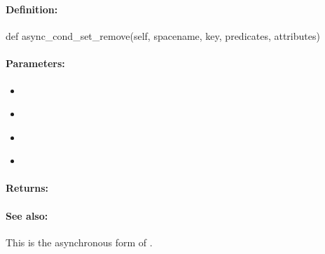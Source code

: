 \pagebreak
\subsubsection{}
\label{api:python:async_cond_set_remove}


\paragraph{Definition:}
\begin{pythoncode}
def async_cond_set_remove(self, spacename, key, predicates, attributes)
\end{pythoncode}

\paragraph{Parameters:}
\begin{itemize}[noitemsep]
\item {}\\

\item {}\\

\item {}\\

\item {}\\

\end{itemize}

\paragraph{Returns:}


\paragraph{See also:}  This is the asynchronous form of .

\pagebreak
\subsubsection{}
\label{api:python:group_set_remove}


